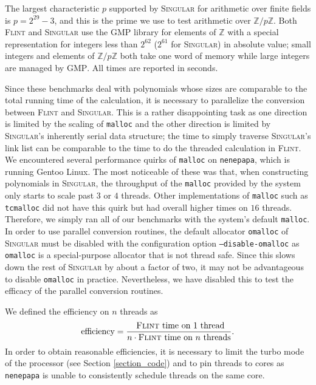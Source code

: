 \documentclass{deliverablereport}
\begin{document}
The largest characteristic $p$ supported by \textsc{Singular} for arithmetic over finite fields is $p = 2^{29}-3$, and this is the prime we use to test arithmetic over $\mathbb{Z}/p \mathbb{Z}$. Both \textsc{Flint} and \textsc{Singular} use the \textsc{GMP} library for elements of $\mathbb{Z}$ with a special representation for integers less than $2^{62}$ ($2^{61}$ for \textsc{Singular}) in absolute value; small integers and elements of $\mathbb{Z}/p \mathbb{Z}$ both take one word of memory while large integers are managed by \textsc{GMP}. All times are reported in seconds.

Since these benchmarks deal with polynomials whose sizes are comparable to the total running time of the calculation, it is necessary to parallelize the conversion between \textsc{Flint} and \textsc{Singular}. This is a rather disappointing task as one direction is limited by the scaling of {\tt malloc} and the other direction is limited by \textsc{Singular}'s inherently serial data structure; the time to simply traverse \textsc{Singular}'s link list can be comparable to the time to do the threaded calculation in \textsc{Flint}. We encountered several performance quirks of {\tt malloc} on {\tt nenepapa}, which is running Gentoo Linux. The most noticeable of these was that, when constructing polynomials in \textsc{Singular}, the throughput of the {\tt malloc} provided by the system only starts to scale past $3$ or $4$ threads. Other implementations of {\tt malloc} such as {\tt tcmalloc} did not have this quirk but had overall higher times on $16$ threads. Therefore, we simply ran all of our benchmarks with the system's default {\tt malloc}. In order to use parallel conversion routines, the default allocator {\tt omalloc} of \textsc{Singular} must be disabled with the configuration option {\tt --disable-omalloc} as {\tt omalloc} is a special-purpose allocator that is not thread safe. Since this slows down the rest of \textsc{Singular} by about a factor of two, it may not be advantageous to disable {\tt omalloc} in practice. Nevertheless, we have disabled this to test the efficacy of the parallel conversion routines. 

We defined the efficiency on $n$ threads as
\begin{equation*}
\text{efficiency} = \frac{\text{ \textsc{Flint} time on $1$ thread}}{n \cdot \text{\textsc{Flint} time on $n$ threads}}\text{.}
\end{equation*}
In order to obtain reasonable efficiencies, it is necessary to limit the turbo mode of the processor (see Section \ref{section_code}) and to pin threads to cores as {\tt nenepapa} is unable to consistently schedule threads on the same core.
\end{document}
